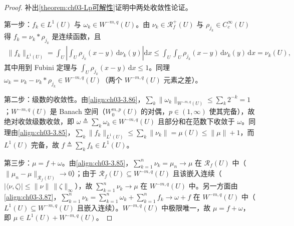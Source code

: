 \documentclass[../../main.tex]{subfiles}%
\begin{document}
\begin{proof}
补出\cref{theorem:ch03-Lp可解性}证明中两处收敛性论证。

第一步：$f_k\in L^1(U)$ 与 $\omega_k\in W^{-m,q}(U)$。由 $\nu_k\in\mathscr{R}^+_f(U)$ 与 $\rho_{j_k}\in C^\infty_c(U)$ 得 $f_k=\nu_k*\rho_{j_k}$ 是连续函数，且
\begin{align*}
\|f_k\|_{L^1(U)}=\int_U\left|\int_U\rho_{j_k}(x-y)\,\mathrm{d}\nu_k(y)\right|\mathrm{d}x
\leqslant\int_U\int_U\rho_{j_k}(x-y)\,\mathrm{d}\nu_k(y)\,\mathrm{d}x=\nu_k(U),
\end{align*}
其中用到 Fubini 定理与 $\int_U\rho_{j_k}(x-y)\,\mathrm{d}x\leqslant1$。同理 $\omega_k=\nu_k-\nu_k*\rho_{j_k}\in W^{-m,q}(U)$（两个 $W^{-m,q}(U)$ 元素之差）。

第二步：级数的收敛性。由\eqref{align:ch03-3.86}，$\sum_k\|\omega_k\|_{W^{-m,q}(U)}\leqslant\sum_k2^{-k}=1$；$W^{-m,q}(U)$ 是 Banach 空间（$W^{m,p}_0(U)$ 的对偶，$p\in(1,\infty)$ 使其完备），故绝对收敛级数收敛，即 $\omega\triangleq\sum_k\omega_k\in W^{-m,q}(U)$ 且部分和在范数下收敛于 $\omega$。同理由\eqref{align:ch03-3.85}，$\sum_k\|f_k\|_{L^1(U)}\leqslant\sum_k\|\nu_k\|=\mu(U)\leqslant\|\mu\|+1$，而 $L^1(U)$ 完备，故 $f\triangleq\sum_kf_k\in L^1(U)$。

第三步：$\mu=f+\omega$。由\eqref{align:ch03-3.85}，$\sum_{k=1}^n\nu_k=\mu_n\to\mu$ 在 $\mathscr{R}_f(U)$ 中（$\|\mu_n-\mu\|_{\mathscr{R}_f(U)}\to0$）；由于 $\mathscr{R}_f(U)\subseteq W^{-m,q}(U)$ 且该嵌入连续（$|\langle\nu,\zeta\rangle|\leqslant\|\nu\|\,\|\zeta\|_\infty$），故 $\sum_{k=1}^n\nu_k\to\mu$ 在 $W^{-m,q}(U)$ 中。另一方面由\eqref{align:ch03-3.87}，$\sum_{k=1}^n\nu_k=\sum_{k=1}^n\omega_k+\sum_{k=1}^nf_k\to\omega+f$ 在 $W^{-m,q}(U)$ 中（$L^1(U)\subseteq W^{-m,q}(U)$ 且嵌入连续）。$W^{-m,q}(U)$ 中极限唯一，故 $\mu=f+\omega$，即 $\mu\in L^1(U)+W^{-m,q}(U)$。
\end{proof}
\end{document}
